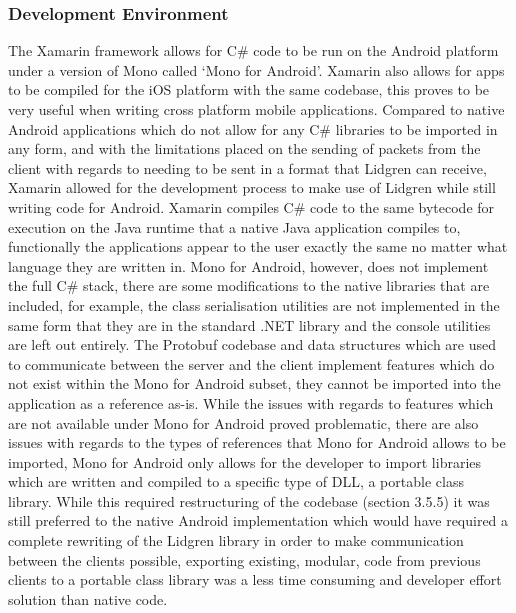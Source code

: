 \documentclass{article}
\begin{document}
\subsubsection{Development Environment}
The Xamarin framework allows for C\# code to be run on the Android platform under a version of Mono called ‘Mono for Android’. Xamarin also allows for apps to be compiled for the iOS platform with the same codebase, this proves to be very useful when writing cross platform mobile applications. Compared to native Android applications which do not allow for any C\# libraries to be imported in any form, and with the limitations placed on the sending of packets from the client with regards to needing to be sent in a format that Lidgren can receive, Xamarin allowed for the development process to make use of Lidgren while still writing code for Android. Xamarin compiles C\# code to the same bytecode for execution on the Java runtime that a native Java application compiles to, functionally the applications appear to the user exactly the same no matter what language they are written in. Mono for Android, however, does not implement the full C\# stack, there are some modifications to the native libraries that are included, for example, the class serialisation utilities are not implemented in the same form that they are in the standard .NET library and the console utilities are left out entirely. The Protobuf codebase and data structures which are used to communicate between the server and the client implement features which do not exist within the Mono for Android subset, they cannot be imported into the application as a reference as-is. While the issues with regards to features which are not available under Mono for Android proved problematic, there are also issues with regards to the types of references that Mono for Android allows to be imported, Mono for Android only allows for the developer to import libraries which are written and compiled to a specific type of DLL, a portable class library. While this required restructuring of the codebase (section 3.5.5) it was still preferred to the native Android implementation which would have required a complete rewriting of the Lidgren library in order to make communication between the clients possible, exporting existing, modular, code from previous clients to a portable class library was a less time consuming and developer effort solution than native code.
\end{document}
